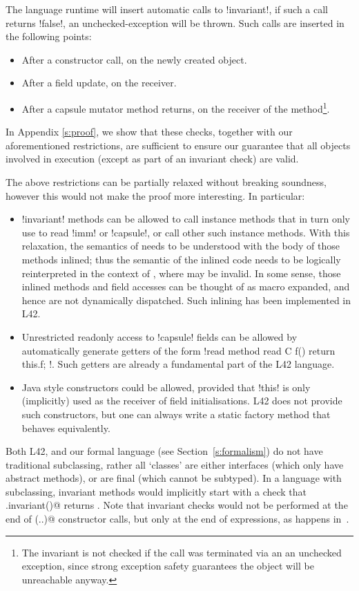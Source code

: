 The language runtime will insert automatic calls to \Q!invariant!, if such a call returns \Q!false!, an unchecked-exception will be thrown. Such calls are inserted in the following points:
\begin{itemize}
	\item After a constructor call, on the newly created object.
	\item After a field update, on the receiver.
	\item After a capsule mutator method returns, on the receiver of the method\footnote{The invariant is not checked if the call was terminated via an an unchecked exception, since strong exception safety guarantees the object will be unreachable anyway.}.
\end{itemize}
In Appendix \ref{s:proof}, we show that these checks, together with our aforementioned restrictions, are sufficient to ensure our guarantee that all objects involved in execution (except as part of an invariant check) are valid.

The above restrictions can be partially relaxed without breaking soundness, however this would not make the proof more interesting. In particular:
\begin{itemize}
	\item \Q!invariant! methods can be allowed to call instance methods that in turn only use \Q@this@ to read \Q!imm! or \Q!capsule!, or call other such instance methods. With this relaxation, the semantics of \Q@invariant@ needs to be understood with the body of those methods inlined; thus the semantic of the inlined code needs to be logically reinterpreted in the context of \Q@invariant@, where \Q@this@ may be invalid. In some sense, those inlined methods and field accesses can be thought of as macro expanded, and hence are not dynamically dispatched. Such inlining has been implemented in L42.

	\item Unrestricted readonly access to \Q!capsule! fields can be allowed by automatically generate getters of the form \Q!read method read C f() { return this.f; }!. Such getters are already a fundamental part of the L42 language.
	
	\item Java style constructors could be allowed, provided that \Q!this! is only (implicitly) used as the receiver of field initialisations. L42 does not provide such constructors, but one can always write a static factory method that behaves equivalently.
\end{itemize}
Both L42, and our formal language (see Section~\ref{s:formalism}) do not have traditional subclassing, rather all `classes' are either interfaces (which only have abstract methods), or are final (which cannot be subtyped). In a language with subclassing, invariant methods would implicitly start with a check that \Q@super.invariant()@ returns \Q@true@. Note that invariant checks would not be performed at the end of \Q@super(..)@ constructor calls, but only at the end of \Q@new@ expressions, as happens in~\cite{feldman2006jose}.

